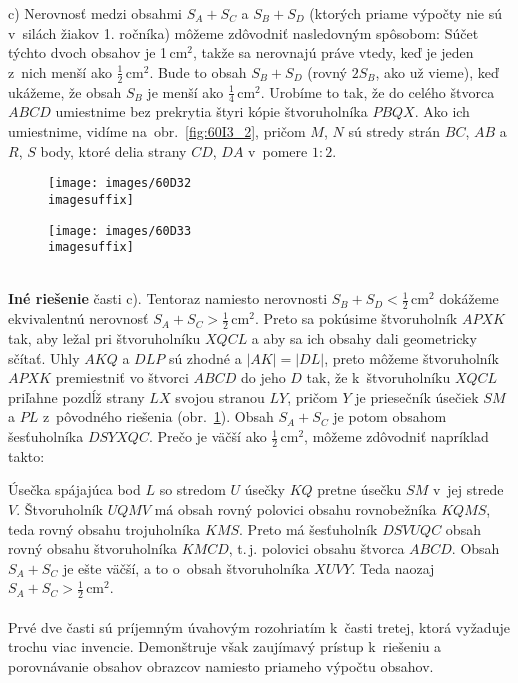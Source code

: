 {c) Nerovnosť medzi obsahmi $S_A + S_C$ a $S_B + S_D$ (ktorých priame výpočty nie sú v~silách žiakov 1. ročníka) môžeme zdôvodniť nasledovným spôsobom: Súčet týchto dvoch obsahov je 1\,cm$^2$, takže sa nerovnajú práve vtedy, keď je jeden z~nich menší ako $\frac{1}{2}$\,cm$^2$. Bude to obsah $S_B +S_D$ (rovný $2S_B$, ako už vieme), keď ukážeme, že obsah $S_B$ je menší ako $\frac{1}{4}$\,cm$^2$. Urobíme to tak, že do celého štvorca $ABCD$ umiestnime bez prekrytia štyri kópie štvoruholníka $PBQX$. Ako ich umiestnime, vidíme na~obr.~\ref{fig:60I3_2}, pričom $M$, $N$ sú stredy strán $BC$, $AB$ a $R$, $S$ body, ktoré delia strany $CD$, $DA$ v~pomere $1 : 2$.
\begin{figure}[h]
    \centering
    \begin{minipage}{0.45\textwidth}
        \centering
        \texttt{[image: images/60D32\\imagesuffix]}
        \caption{}
        \label{fig:60I3_2}
    \end{minipage}\hfill
    \begin{minipage}{0.45\textwidth}
        \centering
        \texttt{[image: images/60D33\\imagesuffix]}
        \caption{}
        \label{fig:60I3_3}
    \end{minipage}
\end{figure}
\\
\textbf{Iné riešenie} časti c). Tentoraz namiesto nerovnosti $S_B + S_ D < \frac{1}{2}$\,cm$^2$ dokážeme ekvivalentnú nerovnosť $S_A +S_C >\frac{1}{2}$\,cm$^2$. Preto sa pokúsime  štvoruholník $APXK$ tak, aby ležal pri štvoruholníku $XQCL$ a aby sa ich obsahy dali geometricky sčítať. Uhly $AKQ$ a $DLP$ sú zhodné a $| AK | = | DL |$, preto môžeme štvoruholník $APXK$ premiestniť vo štvorci $ABCD$ do jeho  $D$ tak, že k~štvoruholníku $XQCL$ priľahne pozdĺž strany $LX$ svojou stranou $LY$, pričom $Y$ je priesečník úsečiek $SM$ a $PL$ z~pôvodného riešenia (obr.~\ref{fig:60I3_3}). Obsah $S_A + S_C$ je potom obsahom šesťuholníka $DSYXQC$. Prečo je väčší ako $\frac{1}{2}$\,cm$^2$, môžeme zdôvodniť napríklad takto:

Úsečka spájajúca bod $L$ so stredom $U$ úsečky $KQ$ pretne úsečku $SM$ v~jej strede $V$. Štvoruholník $UQMV$ má obsah rovný polovici obsahu rovnobežníka $KQMS$, teda rovný obsahu trojuholníka $KMS$. Preto má šesťuholník $DSV UQC$ obsah rovný obsahu štvoruholníka $KMCD$,  t.\,j. polovici obsahu štvorca $ABCD$. Obsah $S_A +S_C$ je ešte väčší, a to o~obsah štvoruholníka $XUVY$. Teda naozaj $S_A + S_C >\frac{1}{2}$\,cm$^2$.\\
\\
\kom Prvé dve časti sú príjemným úvahovým rozohriatím k~časti tretej, ktorá vyžaduje trochu viac invencie. Demonštruje však zaujímavý prístup k~riešeniu a porovnávanie obsahov obrazcov namiesto priameho výpočtu obsahov.\\
}